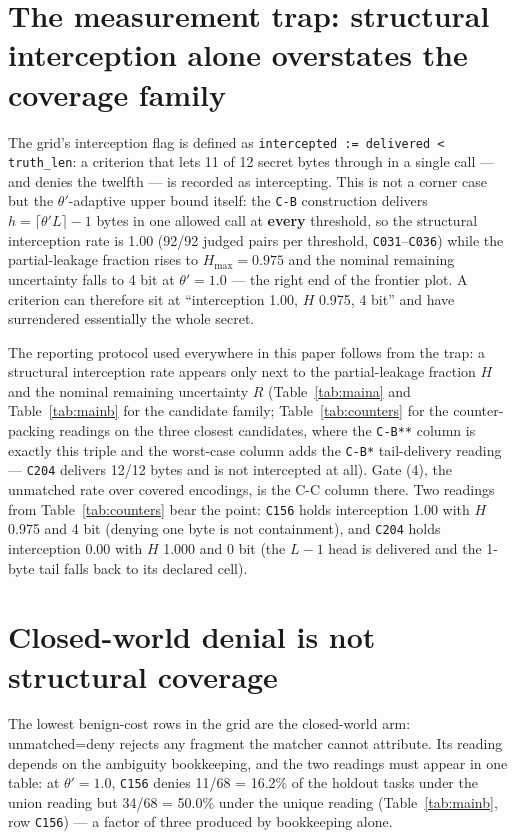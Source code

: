 \documentclass[preprint,12pt]{elsarticle}
\begin{document}
\section{The measurement trap: structural interception alone overstates the coverage
family}\label{sec:trap}

The grid's interception flag is defined as \texttt{intercepted := delivered < truth\_len}: a
criterion that lets 11 of 12 secret bytes through in a single call --- and denies the twelfth ---
is recorded as intercepting. This is not a corner case but the $\theta'$-adaptive upper bound
itself: the \texttt{C-B} construction delivers $h = \lceil \theta' L \rceil - 1$ bytes in one
allowed call at \textbf{every} threshold, so the structural interception rate is 1.00 (92/92 judged
pairs per threshold, \texttt{C031}--\texttt{C036}) while the partial-leakage fraction rises to
$H_{\max} = 0.975$ and the nominal remaining uncertainty falls to 4 bit at $\theta' = 1.0$ --- the
right end of the frontier plot. A criterion can therefore sit at ``interception 1.00, $H$ 0.975,
4 bit'' and have surrendered essentially the whole secret.

The reporting protocol used everywhere in this paper follows from the trap: a structural
interception rate appears only next to the partial-leakage fraction $H$ and the nominal remaining
uncertainty $R$ (Table~\ref{tab:maina} and Table~\ref{tab:mainb} for the candidate family;
Table~\ref{tab:counters} for the counter-packing readings on the three closest candidates, where
the \texttt{C-B**} column is exactly this triple and the worst-case column adds the \texttt{C-B*}
tail-delivery reading --- \texttt{C204} delivers 12/12 bytes and is not intercepted at all).
Gate (4), the unmatched rate over covered encodings, is the C-C column there. Two readings from
Table~\ref{tab:counters} bear the point: \texttt{C156} holds interception 1.00 with $H$ 0.975 and
4 bit (denying one byte is not containment), and \texttt{C204} holds interception 0.00 with $H$
1.000 and 0 bit (the $L-1$ head is delivered and the 1-byte tail falls back to its declared cell).



\section{Closed-world denial is not structural coverage}\label{sec:cw}

The lowest benign-cost rows in the grid are the closed-world arm: unmatched=deny rejects any
fragment the matcher cannot attribute. Its reading depends on the ambiguity bookkeeping, and the
two readings must appear in one table: at $\theta' = 1.0$, \texttt{C156} denies 11/68 = 16.2\% of
the holdout tasks under the union reading but 34/68 = 50.0\% under the unique reading
(Table~\ref{tab:mainb}, row \texttt{C156}) --- a factor of three produced by bookkeeping alone.
\end{document}
